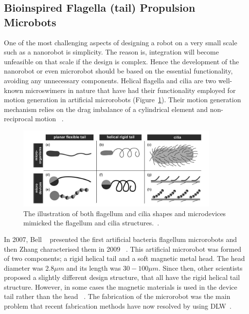 \documentclass[a4paper,11pt]{article}
\begin{document}
\begin{sloppypar}
\subsection{Bioinspired Flagella (tail) Propulsion Microbots}

One of the most challenging aspects of designing a robot on a very small scale such 
as a nanorobot is simplicity. The reason is, integration will become unfeasible on that
 scale if the design is complex. Hence the development of the nanorobot or even microrobot
 should be based on the essential functionality, avoiding any unnecessary components. Helical 
flagella and cilia are two well-known microswimers in nature that have had their functionality employed for motion 
generation in artificial microrobots  (Figure~\ref{cilia}). Their motion generation mechanism relies on
 the drag imbalance of a cylindrical element and non-reciprocal motion ~\citep{gao2013bioinspired}. 



\begin{figure}
  \centering
    \includegraphics[width=0.9\textwidth]{cilia}
  \caption{The illustration of both flagellum and cilia shapes and microdevices mimicked the flagellum and cilia 
structures.~\citep{peyer2013bio}.}
  \label{cilia}
\end{figure}

In 2007, Bell ~\citep{gao2013bioinspired} presented the first artificial bacteria flagellum microrobots and then
 Zhang characterised them in 2009 ~\citep{gao2013bioinspired}. This artificial microrobot was formed of two 
components; a rigid helical tail and a soft magnetic metal head. The head diameter 
was $2.8 \mu  m$ and its length was $30-100 \mu m$. Since then, other scientists proposed a slightly different design 
structure, that all have the rigid helical tail structure. However, in some cases the magnetic
 materials is used in the device tail rather than the head ~\citep{gao2013bioinspired}. 
The fabrication of the microrobot was the main problem that recent fabrication methods 
have now resolved by using DLW~\citep{gao2013bioinspired}. 



\end{sloppypar}
\end{document}
